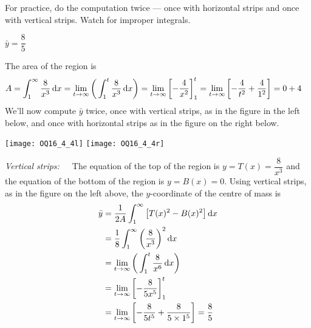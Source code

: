 \begin{hint}
 For practice, do the computation twice --- once with horizontal strips and once with vertical strips. Watch for improper integrals.
\end{hint}

\begin{answer}
$\bar y = \dfrac{8}{5}$
\end{answer}

\begin{solution}
The area of the region is
\begin{align*}
A&=\int_1^\infty \frac{8}{x^3}\,\mathrm{d}x
= \lim_{t\to\infty} \bigg( \int_1^t \frac{8}{x^3}\,\mathrm{d}x \bigg)
= \lim_{t\to\infty} \bigg[ {-}\frac{4}{x^2}\bigg]_1^t
= \lim_{t\to\infty} \bigg[ {-}\frac{4}{t^2} + \frac{4}{1^2} \bigg]
= 0 + 4
\end{align*}
We'll now compute $\bar y$ twice, once with vertical strips, as in the figure in the left below,
and once with horizontal strips as in the figure on the right below.

\begin{center}
       \texttt{[image: OQ16\_4\_4l]}\qquad
       \texttt{[image: OQ16\_4\_4r]}
\end{center}


\noindent \emph{Vertical strips:}\ \ \
The equation of the top of the region is $y=T(x)=\dfrac{8}{x^3}$ and the equation of the
bottom of the region is $y=B(x)=0$.
Using vertical strips, as in the figure on the left above,
the $y$-coordinate of the centre of mass is
\begin{align*}
\bar y & = \frac{1}{2A}\int_1^\infty  \big[T(x)^2-B(x)^2\big]\,\mathrm{d}x \\
&= \frac{1}{8}\int_1^\infty \bigg( \frac{8}{x^3} \bigg)^2 \,\mathrm{d}x  \\
&= \lim_{t\to\infty} \bigg( \int_1^t \frac{8}{x^6}\,\mathrm{d}x \bigg) \\
&= \lim_{t\to\infty} \bigg[ {-}\frac{8}{5x^5}\bigg]_1^t  \\
&= \lim_{t\to\infty} \bigg[ {-}\frac{8}{5t^5} + \frac{8}{5\times1^5} \bigg] = \frac{8}{5}
\end{align*}


\end{solution}
